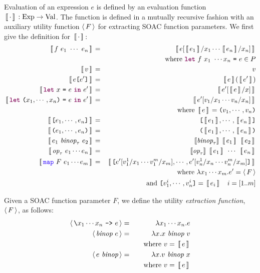 \documentclass[oneside,11pt]{book}
\begin{document}
Evaluation of an expression $e$ is defined by an evaluation function
$\,[\![\,\cdot\,]\!]\, : \mathrm{Exp} \rightarrow \mathrm{Val}$. The function
is defined in a mutually recursive fashion with an auxiliary utility
function $\langle\,F\,\rangle$ for extracting SOAC function parameters. We
first give the definition for $\,[\![\,\cdot\,]\!]\,$:
\begin{eqnarray*}
  \Eval{f~e_1~\cdots~e_n} & = & \Eval{e[\Eval{e_1}/x_1\cdots \Eval{e_n}/x_n]} \\ & & ~~~ \mathrm{where}~\fw{let}~f~x_1~ \cdots x_n ~\kw{=}~ e \in P \\
  \Eval{v} & = & v \\
  \Eval{e\kw{[}e'\kw{]}} & = & \Eval{e}(\Eval{e'}) \\
  \Eval{\fw{let}~x~\kw{=}~e~\fw{in}~e'} & = & \Eval{e'[\Eval{e}/x]} \\
  \Eval{\fw{let}~\kw{(}x_1,\cdots,x_n\kw{)}~\kw{=}~e~\fw{in}~e'} & = & \Eval{e'[v_1/x_1\cdots v_n/x_n]} \\ & & ~~~ \mathrm{where}~ \Eval{e} = \kw{(}v_1,\cdots,v_n\kw{)} \\
  \Eval{\kw{[}e_1,\cdots,e_n\kw{]}} & = & \kw{[}\Eval{e_1},\cdots,\Eval{e_n}\kw{]} \\
  \Eval{\kw{(}e_1,\cdots,e_n\kw{)}} & = & \kw{(}\Eval{e_1},\cdots,\Eval{e_n}\kw{)} \\
  \Eval{e_1~\id{binop}_\tau~e_2} & = & \sem{\id{binop}_\tau}~\Eval{e_1}~\Eval{e_2} \\
  \Eval{\id{op}_\tau~e_1\cdots e_n} & = & \sem{\id{op}_\tau}~\Eval{e_1}~\cdots~\Eval{e_n} \\
  \Eval{\fop{map}~F~e_1\cdots e_m} & = & \Eval{\kw{[}e'[v_1^1/x_1\cdots v_1^m/x_m],\cdots,e'[v_n^1/x_n\cdots v_n^m/x_m]\kw{]}} \\
    & & ~~~\mathrm{where}~\lambda x_1\cdots x_m . e' = \extractF{F} \\
    & & ~~~~~\mathrm{and}~ \kw{[}v_1^i,\cdots,v_n^i\kw{]} = \Eval{e_i} ~~~ i=[1..m]
\end{eqnarray*}

Given a SOAC function parameter $F$, we define the utility \emph{extraction function}, $\langle\,F\,\rangle$, as follows:
\begin{eqnarray*}
  \langle\,\texttt{\textbackslash}x_1\cdots x_n~\texttt{->}~ e\,\rangle & = & \lambda x_1 \cdots x_n . e \\
  \langle\,\mbox{\it{binop}}~e\,\rangle & = & \lambda x . x~\mbox{\it{binop}}~v \\
    & & ~~~\mathrm{where}~v = \,[\![\,e\,]\!]\, \\
  \langle\,e~\mbox{\it{binop}}\,\rangle & = & \lambda x . v~\mbox{\it{binop}}~x \\
    & & ~~~\mathrm{where}~v = \,[\![\,e\,]\!]\,
\end{eqnarray*}
\end{document}
